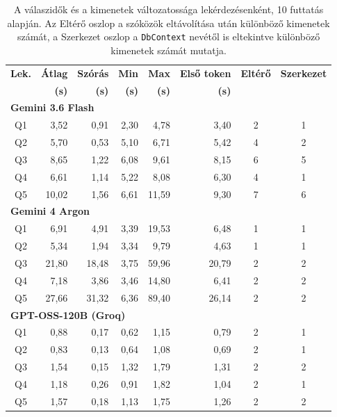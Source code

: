 \documentclass[a4paper,12pt]{article}
\begin{document}
\begin{table}[H]
\centering
\renewcommand{\arraystretch}{1.3}
\footnotesize
\begin{tabular}{|c|r|r|r|r|r|c|c|}
\hline
\textbf{Lek.} & \textbf{Átlag} & \textbf{Szórás} & \textbf{Min} & \textbf{Max} & \textbf{Első token} & \textbf{Eltérő} & \textbf{Szerkezet} \\
 & \textbf{(s)} & \textbf{(s)} & \textbf{(s)} & \textbf{(s)} & \textbf{(s)} & & \\
\hline
\multicolumn{8}{|l|}{\textbf{Gemini 3.6 Flash}} \\
\hline
Q1 & 3,52 & 0,91 & 2,30 & 4,78 & 3,40 & 2 & 1 \\
Q2 & 5,70 & 0,53 & 5,10 & 6,71 & 5,42 & 4 & 2 \\
Q3 & 8,65 & 1,22 & 6,08 & 9,61 & 8,15 & 6 & 5 \\
Q4 & 6,61 & 1,14 & 5,22 & 8,08 & 6,30 & 4 & 1 \\
Q5 & 10,02 & 1,56 & 6,61 & 11,59 & 9,30 & 7 & 6 \\
\hline
\multicolumn{8}{|l|}{\textbf{Gemini 4 Argon}} \\
\hline
Q1 & 6,91 & 4,91 & 3,39 & 19,53 & 6,48 & 1 & 1 \\
Q2 & 5,34 & 1,94 & 3,34 & 9,79 & 4,63 & 1 & 1 \\
Q3 & 21,80 & 18,48 & 3,75 & 59,96 & 20,79 & 2 & 2 \\
Q4 & 7,18 & 3,86 & 3,46 & 14,80 & 6,41 & 2 & 2 \\
Q5 & 27,66 & 31,32 & 6,36 & 89,40 & 26,14 & 2 & 2 \\
\hline
\multicolumn{8}{|l|}{\textbf{GPT-OSS-120B (Groq)}} \\
\hline
Q1 & 0,88 & 0,17 & 0,62 & 1,15 & 0,79 & 2 & 1 \\
Q2 & 0,83 & 0,13 & 0,64 & 1,08 & 0,69 & 2 & 1 \\
Q3 & 1,54 & 0,15 & 1,32 & 1,79 & 1,31 & 2 & 2 \\
Q4 & 1,18 & 0,26 & 0,91 & 1,82 & 1,04 & 2 & 1 \\
Q5 & 1,57 & 0,18 & 1,13 & 1,75 & 1,26 & 2 & 2 \\
\hline
\end{tabular}
\caption{A válaszidők és a kimenetek változatossága lekérdezésenként, 10 futtatás alapján. Az Eltérő oszlop a szóközök eltávolítása után különböző kimenetek számát, a Szerkezet oszlop a \texttt{DbContext} nevétől is eltekintve különböző kimenetek számát mutatja.}
\label{tab:llm-comparison}
\end{table}
\end{document}
